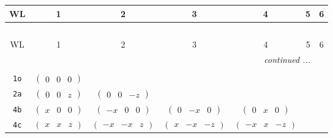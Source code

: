 \documentclass[fleqn,9pt,landscape]{jsarticle}
\begin{document}
\begin{center}
\renewcommand{\arraystretch}{1.2}
\begin{longtable}{ccccccc}
 \hline \hline
WL & 1 & 2 & 3 & 4 & 5 & 6 \\ \hline \endfirsthead

\multicolumn{6}{l}{\tablename\ \thetable{}} \\
 \hline \hline
WL & 1 & 2 & 3 & 4 & 5 & 6 \\ \hline \endhead

 \hline \hline
\multicolumn{6}{r}{\footnotesize\it continued ...} \\ \endfoot

 \hline \hline
\multicolumn{6}{r}{} \\ \endlastfoot

{\tt 1o} & $ \begin{pmatrix} 0 & 0 & 0 \end{pmatrix} $ & $  $ & $  $ & $  $ & $  $ & $  $ \\ \hline
{\tt 2a} & $ \begin{pmatrix} 0 & 0 & z \end{pmatrix} $ & $ \begin{pmatrix} 0 & 0 & - z \end{pmatrix} $ & $  $ & $  $ & $  $ & $  $ \\ \hline
{\tt 4b} & $ \begin{pmatrix} x & 0 & 0 \end{pmatrix} $ & $ \begin{pmatrix} - x & 0 & 0 \end{pmatrix} $ & $ \begin{pmatrix} 0 & - x & 0 \end{pmatrix} $ & $ \begin{pmatrix} 0 & x & 0 \end{pmatrix} $ & $  $ & $  $ \\ \hline
{\tt 4c} & $ \begin{pmatrix} x & x & z \end{pmatrix} $ & $ \begin{pmatrix} - x & - x & z \end{pmatrix} $ & $ \begin{pmatrix} x & - x & - z \end{pmatrix} $ & $ \begin{pmatrix} - x & x & - z \end{pmatrix} $ & $  $ & $  $ \\ \hline

\end{longtable}
\end{center}
\end{document}
